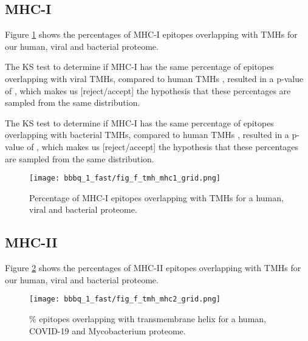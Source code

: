 \subsection{MHC-I}

Figure \ref{fig:1} shows the percentages of MHC-I epitopes overlapping 
with TMHs for our human, viral and bacterial proteome.

The KS test to determine if MHC-I has the same percentage 
of epitopes overlapping with viral TMHs, 
compared to human TMHs ,
resulted in a p-value of ,
which makes us [reject/accept] the hypothesis that these percentages
are sampled from the same distribution. 

The KS test to determine if MHC-I has the same percentage 
of epitopes overlapping with bacterial TMHs, 
compared to human TMHs ,
resulted in a p-value of ,
which makes us [reject/accept] the hypothesis that these percentages
are sampled from the same distribution. 

\begin{figure}[!htbp]
  \texttt{[image: bbbq\_1\_fast/fig\_f\_tmh\_mhc1\_grid.png]}
  \caption{
    Percentage of MHC-I epitopes overlapping with TMHs
    for a human, viral and bacterial proteome.
  }
  \label{fig:1}
\end{figure}

\subsection{MHC-II}

Figure \ref{fig:2} shows the percentages of MHC-II epitopes overlapping 
with TMHs for our human, viral and bacterial proteome.

\begin{figure}[!htbp]
  \texttt{[image: bbbq\_1\_fast/fig\_f\_tmh\_mhc2\_grid.png]}
  \caption{
    \% epitopes overlapping with transmembrane helix
    for a human, COVID-19 and Mycobacterium proteome.
  }
  \label{fig:2}
\end{figure}

